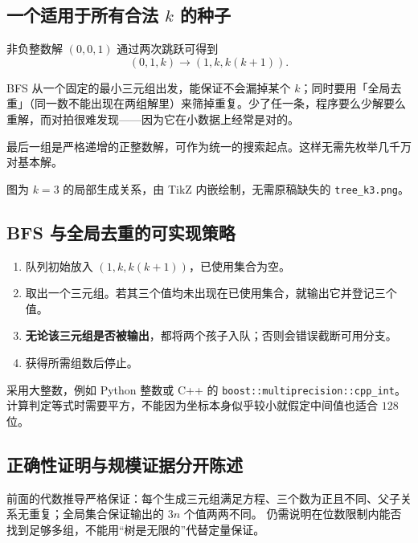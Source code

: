 \documentclass[UTF8,a4paper,11pt,twoside,openright,fontset=fandol]{ctexbook}
\theoremstyle{definition}
\begin{document}
\subsection{一个适用于所有合法 \texorpdfstring{$k$}{k} 的种子}
非负整数解 $(0,0,1)$ 通过两次跳跃可得到
\[
 (0,1,k)\longrightarrow(1,k,k(k+1)).
\]

\begin{tip}
BFS 从一个固定的最小三元组出发，能保证不会漏掉某个 $k$；同时要用「全局去重」（同一数不能出现在两组解里）来筛掉重复。少了任一条，程序要么少解要么重解，而对拍很难发现——因为它在小数据上经常是对的。
\end{tip}

最后一组是严格递增的正整数解，可作为统一的搜索起点。这样无需先枚举几千万对基本解。

\begin{center}
\end{center}
图为 $k=3$ 的局部生成关系，由 TikZ 内嵌绘制，无需原稿缺失的 \texttt{tree\_k3.png}。

\subsection{BFS 与全局去重的可实现策略}
\begin{enumerate}
\item 队列初始放入 $(1,k,k(k+1))$，已使用集合为空。
\item 取出一个三元组。若其三个值均未出现在已使用集合，就输出它并登记三个值。
\item \textbf{无论该三元组是否被输出}，都将两个孩子入队；否则会错误截断可用分支。
\item 获得所需组数后停止。
\end{enumerate}
采用大整数，例如 Python 整数或 C++ 的 \texttt{boost::multiprecision::cpp\_int}。计算判定等式时需要平方，不能因为坐标本身似乎较小就假定中间值也适合 $128$ 位。

\subsection{正确性证明与规模证据分开陈述}
前面的代数推导严格保证：每个生成三元组满足方程、三个数为正且不同、父子关系无重复；全局集合保证输出的 $3n$ 个值两两不同。
仍需说明在位数限制内能否找到足够多组，不能用“树是无限的”代替定量保证。
\end{document}
